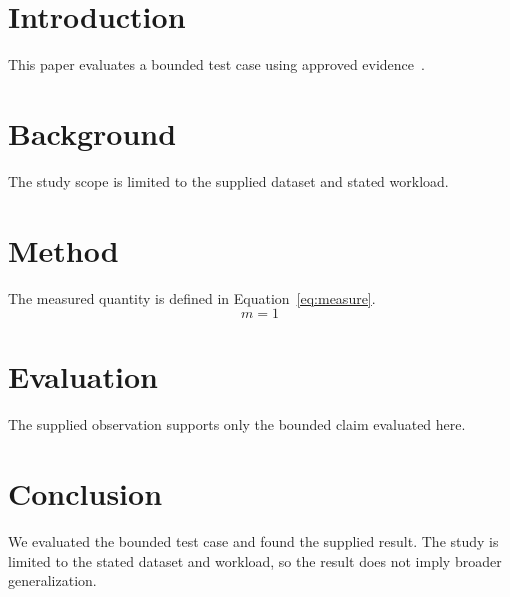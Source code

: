 \documentclass{article}
\begin{document}
\section{Introduction}
This paper evaluates a bounded test case using approved evidence~\cite{approved2026}.

\section{Background}
The study scope is limited to the supplied dataset and stated workload.

\section{Method}
The measured quantity is defined in Equation~\eqref{eq:measure}.
\begin{equation}
  m = 1
  \label{eq:measure}
\end{equation}

\section{Evaluation}
The supplied observation supports only the bounded claim evaluated here.

\section{Conclusion}
We evaluated the bounded test case and found the supplied result. The study is limited to the stated dataset and workload, so the result does not imply broader generalization.

\end{document}
